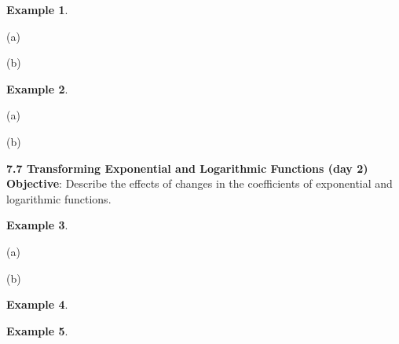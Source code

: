 \documentclass{report}
\theoremstyle{definition}
\newtheorem{example}{\bf Example}
\begin{document}
\begin{example}

\end{example}

\begin{minipage}[t]{0.45\linewidth}
(a)  
\end{minipage}
\hfill
\begin{minipage}[t]{0.45\linewidth}
(b) 
\end{minipage}

\vfill

\begin{example}

\end{example}

\begin{minipage}[t]{0.45\linewidth}
(a) 
\end{minipage}
\hfill
\begin{minipage}[t]{0.45\linewidth}
(b) 
\end{minipage}


\vfill
\vfill
 \noindent{}
 \newpage

\noindent\Large\textbf{7.7 Transforming Exponential and Logarithmic Functions (day 2)}\\
\noindent \hfill\small \noindent \textbf{Objective}: Describe the effects of changes in the coefficients of exponential and logarithmic functions. \normalsize\\

\begin{example}
\end{example}

\begin{minipage}[t]{0.45\linewidth}
(a)  
\end{minipage}
\hfill
\begin{minipage}[t]{0.45\linewidth}
(b) 
\end{minipage}

\vfill

\begin{example}

\end{example}
\vfill


\begin{example}

\end{example}
\end{document}

